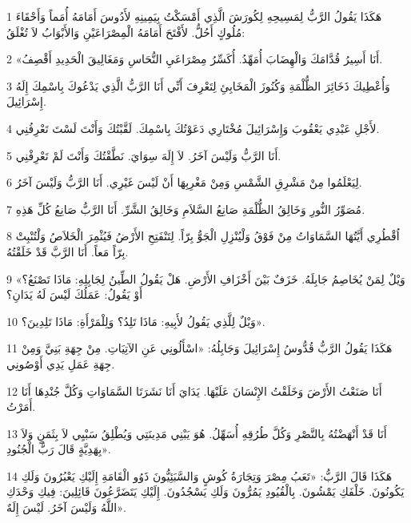 \par 1 هَكَذَا يَقُولُ الرَّبُّ لِمَسِيحِهِ لِكُورَشَ الَّذِي أَمْسَكْتُ بِيَمِينِهِ لأَدُوسَ أَمَامَهُ أُمَماً وَأَحْقَاءَ مُلُوكٍ أَحُلُّ. لأَفْتَحَ أَمَامَهُ الْمِصْرَاعَيْنِ وَالأَبْوَابُ لاَ تُغْلَقُ:
\par 2 «أَنَا أَسِيرُ قُدَّامَكَ وَالْهِضَابَ أُمَهِّدُ. أُكَسِّرُ مِصْرَاعَيِ النُّحَاسِ وَمَغَالِيقَ الْحَدِيدِ أَقْصِفُ.
\par 3 وَأُعْطِيكَ ذَخَائِرَ الظُّلْمَةِ وَكُنُوزَ الْمَخَابِئِ لِتَعْرِفَ أَنِّي أَنَا الرَّبُّ الَّذِي يَدْعُوكَ بِاسْمِكَ إِلَهُ إِسْرَائِيلَ.
\par 4 لأَجْلِ عَبْدِي يَعْقُوبَ وَإِسْرَائِيلَ مُخْتَارِي دَعَوْتُكَ بِاسْمِكَ. لَقَّبْتُكَ وَأَنْتَ لَسْتَ تَعْرِفُنِي.
\par 5 أَنَا الرَّبُّ وَلَيْسَ آخَرُ. لاَ إِلَهَ سِوَايَ. نَطَّقْتُكَ وَأَنْتَ لَمْ تَعْرِفْنِي.
\par 6 لِيَعْلَمُوا مِنْ مَشْرِقِ الشَّمْسِ وَمِنْ مَغْرِبِهَا أَنْ لَيْسَ غَيْرِي. أَنَا الرَّبُّ وَلَيْسَ آخَرُ.
\par 7 مُصَوِّرُ النُّورِ وَخَالِقُ الظُّلْمَةِ صَانِعُ السَّلاَمِ وَخَالِقُ الشَّرِّ. أَنَا الرَّبُّ صَانِعُ كُلِّ هَذِهِ.
\par 8 اُقْطُرِي أَيَّتُهَا السَّمَاوَاتُ مِنْ فَوْقُ وَلْيُنْزِلِ الْجَوُّ بِرّاً. لِتَنْفَتِحِ الأَرْضُ فَيُثْمِرَ الْخَلاَصُ وَلْتُنْبِتْ بِرّاً مَعاً. أَنَا الرَّبَّ قَدْ خَلَقْتُهُ.
\par 9 «وَيْلٌ لِمَنْ يُخَاصِمُ جَابِلَهُ. خَزَفٌ بَيْنَ أَخْزَافِ الأَرْضِ. هَلْ يَقُولُ الطِّينُ لِجَابِلِهِ: مَاذَا تَصْنَعُ؟ أَوْ يَقُولُ: عَمَلُكَ لَيْسَ لَهُ يَدَانِ؟
\par 10 وَيْلٌ لِلَّذِي يَقُولُ لأَبِيهِ: مَاذَا تَلِدُ؟ وَلِلْمَرْأَةِ: مَاذَا تَلِدِينَ؟».
\par 11 هَكَذَا يَقُولُ الرَّبُّ قُدُّوسُ إِسْرَائِيلَ وَجَابِلُهُ: «اسْأَلُونِي عَنِ الآتِيَاتِ. مِنْ جِهَةِ بَنِيَّ وَمِنْ جِهَةِ عَمَلِ يَدِي أَوْصُونِي.
\par 12 أَنَا صَنَعْتُ الأَرْضَ وَخَلَقْتُ الإِنْسَانَ عَلَيْهَا. يَدَايَ أَنَا نَشَرَتَا السَّمَاوَاتِ وَكُلَّ جُنْدِهَا أَنَا أَمَرْتُ.
\par 13 أَنَا قَدْ أَنْهَضْتُهُ بِالنَّصْرِ وَكُلَّ طُرُقِهِ أُسَهِّلُ. هُوَ يَبْنِي مَدِينَتِي وَيُطْلِقُ سَبْيِي لاَ بِثَمَنٍ وَلاَ بِهَدِيَّةٍ قَالَ رَبُّ الْجُنُودِ».
\par 14 هَكَذَا قَالَ الرَّبُّ: «تَعَبُ مِصْرَ وَتِجَارَةُ كُوشٍ وَالسَّبَئِيُّونَ ذَوُو الْقَامَةِ إِلَيْكِ يَعْبُرُونَ وَلَكِ يَكُونُونَ. خَلْفَكِ يَمْشُونَ. بِالْقُيُودِ يَمُرُّونَ وَلَكِ يَسْجُدُونَ. إِلَيْكِ يَتَضَرَّعُونَ قَائِلِينَ: فِيكِ وَحْدَكِ اللَّهُ وَلَيْسَ آخَرُ. لَيْسَ إِلَهٌ».
